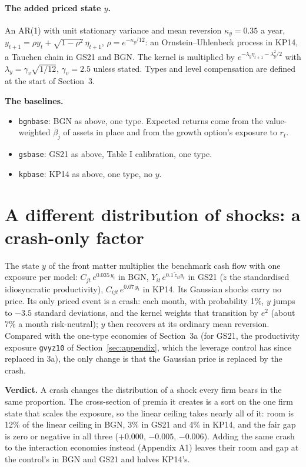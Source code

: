 \documentclass[11pt]{article}
\begin{document}
\paragraph{The added priced state $y$.} An AR(1) with unit stationary variance and mean reversion $\kappa_y = 0.35$ a year, $y_{t+1} = \rho y_t + \sqrt{1-\rho^2}\,\eta_{t+1}$, $\rho = e^{-\kappa_y/12}$: an Ornstein--Uhlenbeck process in KP14, a Tauchen chain in GS21 and BGN. The kernel is multiplied by $e^{-\lambda_y\eta_{t+1}-\lambda_y^2/2}$ with $\lambda_y = \gamma_v\sqrt{1/12}$, $\gamma_v = 2.5$ unless stated. Types and level compensation are defined at the start of Section~3.

\noindent\textbf{The baselines.} 
\begin{itemize}
  \item \texttt{bgnbase}: BGN as above, one type. Expected returns come from the value-weighted $\beta_j$ of assets in place and from the growth option's exposure to $r_t$.
  \item \texttt{gsbase}: GS21 as above, Table I calibration, one type.
  \item \texttt{kpbase}: KP14 as above, one type, no $y$.
\end{itemize}


\section{A different distribution of shocks: a crash-only factor}

The state $y$ of the front matter multiplies the benchmark cash flow with one exposure per model: $C_{jt}\,e^{0.035\,y_t}$ in BGN, $Y_{it}\,e^{0.1\,\tilde z_{it} y_t}$ in GS21 ($\tilde z$ the standardised idiosyncratic productivity), $C_{ijt}\,e^{0.07\,y_t}$ in KP14. Its Gaussian shocks carry no price. Its only priced event is a crash: each month, with probability 1\%, $y$ jumps to $-3.5$ standard deviations, and the kernel weights that transition by $e^{2}$ (about 7\% a month risk-neutral); $y$ then recovers at its ordinary mean reversion. Compared with the one-type economies of Section~3a (for GS21, the productivity exposure \texttt{gvyz10} of Section~\ref{sec:appendix}, which the leverage control has since replaced in 3a), the only change is that the Gaussian price is replaced by the crash.


\noindent\textbf{Verdict.} A crash changes the distribution of a shock every firm bears in the same proportion. The cross-section of premia it creates is a sort on the one firm state that scales the exposure, so the linear ceiling takes nearly all of it: room is 12\% of the linear ceiling in BGN, 3\% in GS21 and 4\% in KP14, and the fair gap is zero or negative in all three ($+0.000$, $-0.005$, $-0.006$). Adding the same crash to the interaction economies instead (Appendix A1) leaves their room and gap at the control's in BGN and GS21 and halves KP14's.
\end{document}
